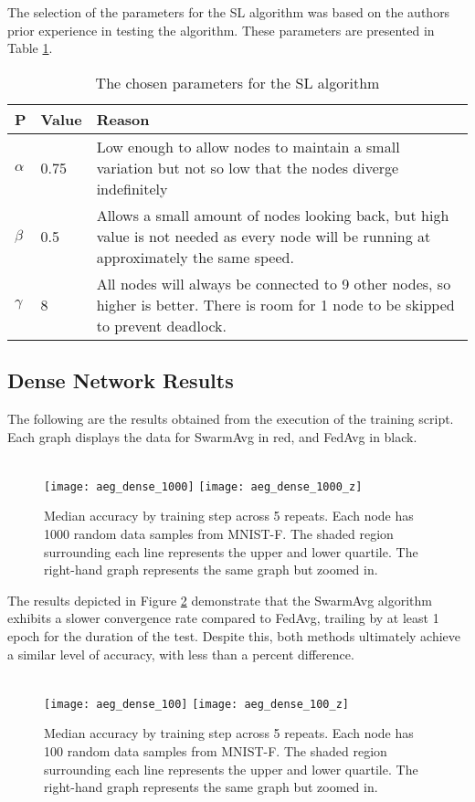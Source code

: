 The selection of the parameters for the SL algorithm was based on the authors prior experience in testing the algorithm. These parameters are presented in Table \ref{slparamsDNP}.
\begin{table}[H]
	\begin{tabular}{p{0.5cm}|l|p{11cm}}
		P & Value & Reason \\ \hline \hline
		$\alpha$  & 0.75  & Low enough to allow nodes to maintain a small variation but not so low that the nodes diverge indefinitely                               \\ \hline
		$\beta$   & 0.5   & Allows a small amount of nodes looking back, but high value is not needed as every node will be running at approximately the same speed. \\ \hline
		$\gamma$  & 8     & All nodes will always be connected to 9 other nodes, so higher is better. There is room for 1 node to be skipped to prevent deadlock.   
	\end{tabular}
	\caption{The chosen parameters for the SL algorithm} \label{slparamsDNP}
\end{table}

\subsection{Dense Network Results}
The following are the results obtained from the execution of the training script. Each graph displays the data for SwarmAvg in red, and FedAvg in black.

\begin{figure}[H] 
	 \\
	\texttt{[image: aeg\_dense\_1000]}
	\texttt{[image: aeg\_dense\_1000\_z]}
	\caption{Median accuracy by training step across 5 repeats. Each node has 1000 random data samples from MNIST-F. The shaded region surrounding each line represents the upper and lower quartile. The right-hand graph represents the same graph but zoomed in.}
	\label{aeg1}
\end{figure}

The results depicted in Figure \ref{aeg2} demonstrate that the SwarmAvg algorithm exhibits a slower convergence rate compared to FedAvg, trailing by at least 1 epoch for the duration of the test. Despite this, both methods ultimately achieve a similar level of accuracy, with less than a percent difference.

\begin{figure}[H] 
	 \\
	\texttt{[image: aeg\_dense\_100]}
	\texttt{[image: aeg\_dense\_100\_z]}
	\caption{Median accuracy by training step across 5 repeats. Each node has 100 random data samples from MNIST-F. The shaded region surrounding each line represents the upper and lower quartile. The right-hand graph represents the same graph but zoomed in.}
	\label{aeg2}
\end{figure}




